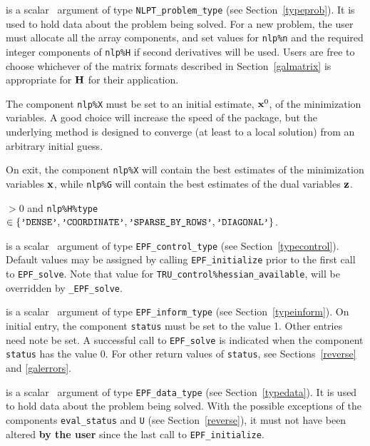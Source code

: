 \documentclass{galahad}
\newcommand{\packagename}{EPF}
\newcommand{\fullpackagename}{\libraryname\_\packagename}
\newcommand{\solver}{{\tt \fullpackagename\_solve}}
\begin{document}
\vspace*{-2mm}
\begin{description}
 is a scalar \intentinout\ argument of type
{\tt NLPT\_problem\_type}
(see Section~\ref{typeprob}).
It is used to hold data about the problem being solved.
For a new problem, the user must allocate all the array components,
and set values for {\tt nlp\%n}
and the required integer components of {\tt nlp\%H} if second derivatives
will be used.
Users are free to choose whichever
of the matrix formats described in Section~\ref{galmatrix}
is appropriate for ${\mathbf{H}}$ for their application.

\noindent
The component {\tt nlp\%X} must be set to an initial estimate, ${\mathbf{x}}^{0}$,
of the minimization variables. A good choice will increase the speed
of the package, but the underlying method is designed to converge (at least
to a local solution) from an arbitrary initial guess.

\noindent
On exit, the component {\tt nlp\%X} will contain the best estimates of the
minimization variables ${\mathbf{x}}$, while {\tt nlp\%G} will contain the best 
estimates of the dual variables ${\mathbf{z}}$.

\noindent
{} $> 0$ and
{\tt nlp\%H\%type} $\in \{
  \mbox{\tt 'DENSE'}, \mbox{\tt 'COORDINATE'}, \mbox{\tt 'SPARSE\_BY\_ROWS'},
  \mbox{\tt 'DIAGONAL'} \}$.

 is a scalar \intentin\ argument of type
{\tt \packagename\_control\_type}
(see Section~\ref{typecontrol}). Default values may be assigned by calling
{\tt \packagename\_initialize} prior to the first call to
{\tt \packagename\_solve}. 
Note that value for {\tt TRU\_control\%hessian\_available},
will be overridden by \solver.

 is a scalar \intentinout\ argument of type
{\tt \packagename\_inform\_type}
(see Section~\ref{typeinform}).
On initial entry, the  component {\tt status} must be set to the value 1.
Other entries need note be set.
A successful call to
{\tt \packagename\_solve}
is indicated when the  component {\tt status} has the value 0.
For other return values of {\tt status}, see Sections~\ref{reverse} and
\ref{galerrors}.

 is a scalar \intentinout\ argument of type
{\tt \packagename\_data\_type}
(see Section~\ref{typedata}). It is used to hold data about the problem being
solved. With the possible exceptions of the components
{\tt eval\_status} and {\tt U} (see Section~\ref{reverse}),
it must not have been altered {\bf by the user} since the last call to
{\tt \packagename\_initialize}.


\end{description}
\end{document}
